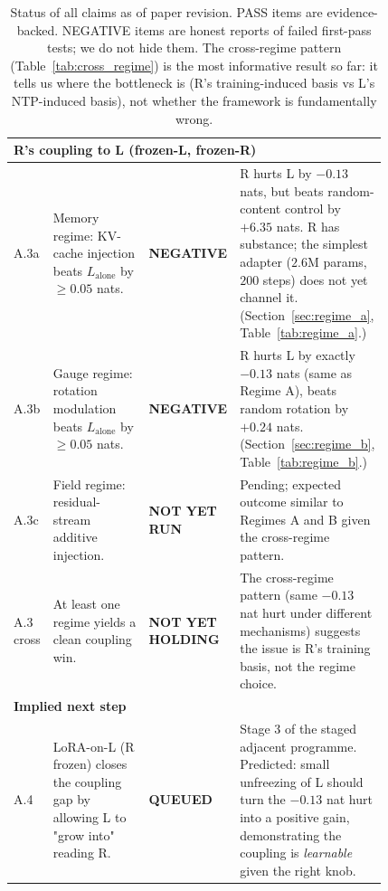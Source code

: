 \documentclass[10pt, twocolumn, a4paper]{article}
\begin{document}
\begin{table}[h]
\begin{tabular}{@{}p{0.06\linewidth} p{0.42\linewidth} l p{0.34\linewidth}@{}}
\midrule
\multicolumn{4}{l}{\textbf{R's coupling to L (frozen-L, frozen-R)}} \\
\midrule
A.3a & Memory regime: KV-cache injection beats $L_{\text{alone}}$ by $\ge 0.05$ nats. & \textbf{NEGATIVE} & R hurts L by $-0.13$ nats, but beats random-content control by $+6.35$ nats. R has substance; the simplest adapter ($2.6$M params, $200$ steps) does not yet channel it. (Section~\ref{sec:regime_a}, Table~\ref{tab:regime_a}.) \\
A.3b & Gauge regime: rotation modulation beats $L_{\text{alone}}$ by $\ge 0.05$ nats. & \textbf{NEGATIVE} & R hurts L by exactly $-0.13$ nats (same as Regime A), beats random rotation by $+0.24$ nats. (Section~\ref{sec:regime_b}, Table~\ref{tab:regime_b}.) \\
A.3c & Field regime: residual-stream additive injection. & \textbf{NOT YET RUN} & Pending; expected outcome similar to Regimes A and B given the cross-regime pattern. \\
A.3 cross & At least one regime yields a clean coupling win. & \textbf{NOT YET HOLDING} & The cross-regime pattern (same $-0.13$ nat hurt under different mechanisms) suggests the issue is R's training basis, not the regime choice. \\

\midrule
\multicolumn{4}{l}{\textbf{Implied next step}} \\
\midrule
A.4 & LoRA-on-L (R frozen) closes the coupling gap by allowing L to "grow into" reading R. & \textbf{QUEUED} & Stage 3 of the staged adjacent programme. Predicted: small unfreezing of L should turn the $-0.13$ nat hurt into a positive gain, demonstrating the coupling is \emph{learnable} given the right knob. \\

\bottomrule
\end{tabular}
\caption{Status of all claims as of paper revision. PASS items are evidence-backed. NEGATIVE items are honest reports of failed first-pass tests; we do not hide them. The cross-regime pattern (Table~\ref{tab:cross_regime}) is the most informative result so far: it tells us where the bottleneck is (R's training-induced basis vs L's NTP-induced basis), not whether the framework is fundamentally wrong.}
\label{tab:status_checklist}
\end{table}
\end{document}
